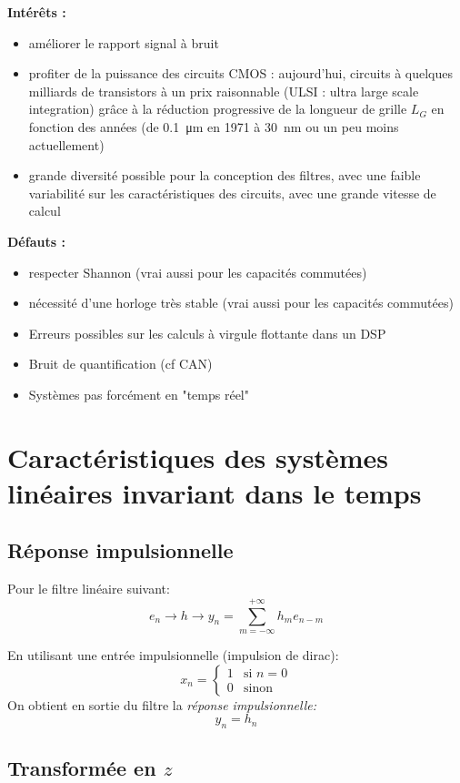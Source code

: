 \documentclass[main.tex]{subfiles}
\begin{document}
\textbf{Intérêts :}
\begin{itemize}
\item améliorer le rapport signal à bruit
\item profiter de la puissance des circuits CMOS : aujourd'hui, circuits à quelques milliards de transistors à un prix raisonnable (ULSI : ultra large scale integration) grâce à la réduction progressive de la longueur de grille $L_G$ en fonction des années (de \SI{0.1}{\micro\meter} en 1971 à \SI{30}{nm} ou un peu moins actuellement)
\item grande diversité possible pour la conception des filtres, avec une faible variabilité sur les caractéristiques des circuits, avec une grande vitesse de calcul
\end{itemize}

\textbf{Défauts :}
\begin{itemize}
\item respecter Shannon (vrai aussi pour les capacités commutées)
\item nécessité d'une horloge très stable (vrai aussi pour les capacités commutées)
\item Erreurs possibles sur les calculs à virgule flottante dans un DSP
\item Bruit de quantification (cf CAN)
\item Systèmes pas forcément en "temps réel"
\end{itemize}


\section{Caractéristiques des systèmes linéaires invariant dans le temps}

\subsection{Réponse impulsionnelle}
Pour le filtre linéaire suivant:
\[e_n \rightarrow \boxed{h} \rightarrow y_n = \sum_{m=-\infty}^{+\infty} h_m e_{n-m} \]
\begin{defin}
En utilisant une entrée impulsionnelle (impulsion de dirac):
\[ x_n = \begin{cases}
    1 & \text{si } n=0\\
    0 & \text{sinon}
    \end{cases}
  \]
  On obtient en sortie du filtre la \emph{réponse impulsionnelle:}
\[ y_n = h_n \]
\end{defin}
\subsection{Transformée en $z$}
\end{document}
